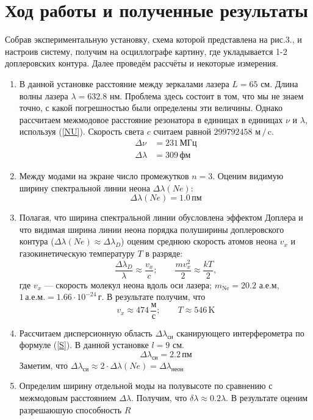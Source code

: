 \documentclass[12pt]{article}
\begin{document}
\section*{Ход работы и полученные результаты}
\par
	Собрав экспериментальную установку, схема которой представлена на рис.3., и настроив систему, получим на осциллографе картину, где укладывается 1-2 доплеровских контура. Далее проведём рассчёты и некоторые измерения.
\begin{enumerate}
	\item
		В данной установке расстояние между зеркалами лазера $L = 65$ см. Длина волны лазера $\lambda = 632.8$ нм. Проблема здесь состоит в том, что мы не знаем точно, с какой погрешностью были определены эти величины. Однако рассчитаем межмодовое расстояние резонатора в единицах в единицах $\nu$ и $\lambda$, используя (\ref{NU}). Скорость света $c$ считаем равной $299792458$ $\text{м} \, / \, \text{c}$. 
		\begin{align*}
			\Delta \nu &= 231 \, \text{МГц} \\
			\Delta \lambda &= 309 \, \text{фм}
		\end{align*}
	\item
		Между модами на экране число промежутков $n = 3$. Оценим видимую ширину спектральной линии неона $\Delta \lambda (Ne)$:
		\[
			\Delta \lambda (Ne) = 1.0 \, \text{пм}
		\]
	\item
		Полагая, что ширина спектральной линии обусловлена эффектом Доплера и что видимая ширина линии неона порядка полуширины доплеровского контура ($\Delta \lambda(Ne) \approx \Delta \lambda_D$) оценим среднюю скорость атомов неона $v_x$ и газокинетическую  температуру $T$ в разряде:
	\[
		\frac{\Delta \lambda_D}{\lambda} \approx \frac{v_x}{c}; \qquad \frac{m v_x^2}{2} \approx \frac{kT}{2},
	\]
		где $v_x$ --- скорость молекул неона вдоль оси лазера; $m_\text{Ne} = 20.2$ а.е.м, $1 \, \text{а.е.м.} = 1.66 \cdot 10^{-24} \, \text{г}$.
		В результате получим, что
		\[
			v_x \approx 474 \, \frac{\text{м}}{\text{с}}; \qquad T \approx 546 \, \text{K}
		\] 
	\item
		Рассчитаем дисперсионную область $\Delta \lambda_\text{си}$ сканирующего интерферометра по формуле (\ref{S}). В данной установке $l = 9$ см.
		\[
			\Delta \lambda_\text{си} = 2.2 \, \text{пм}
		\]
		Заметим, что $\Delta \lambda_\text{си} \approx 2 \cdot \Delta \lambda (Ne) = \Delta \lambda_\text{неон}$
	\item
		Определим ширину отдельной моды на полувысоте по сравнению с межмодовым расстоянием $\Delta \lambda$. Получим, что $\delta \lambda \approx 0.2 \lambda$. В результате оценим разрешаюшую способность $R$

\end{enumerate}
\end{document}
